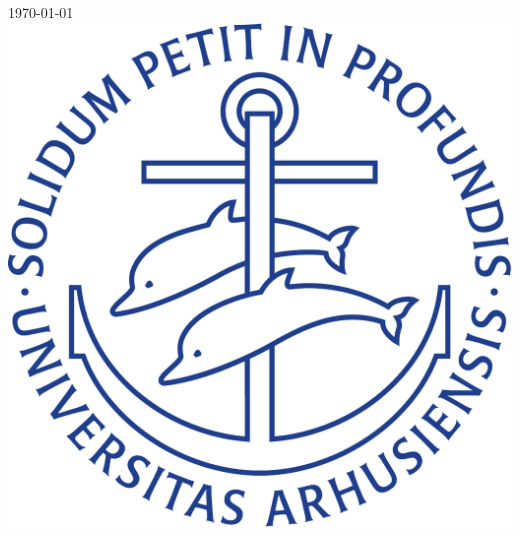 \documentclass[12pt]{article}
\begin{document}
\begin{titlepage}
\vfill\vfill\vfill
{\large \today}\\[2cm] %

\vfill
\includegraphics[width=0.4\columnwidth]{../figures/ausegl_blaa-eps-converted-to.pdf}\\[1cm] %
 

\vfill %
\end{titlepage}
\end{document}

